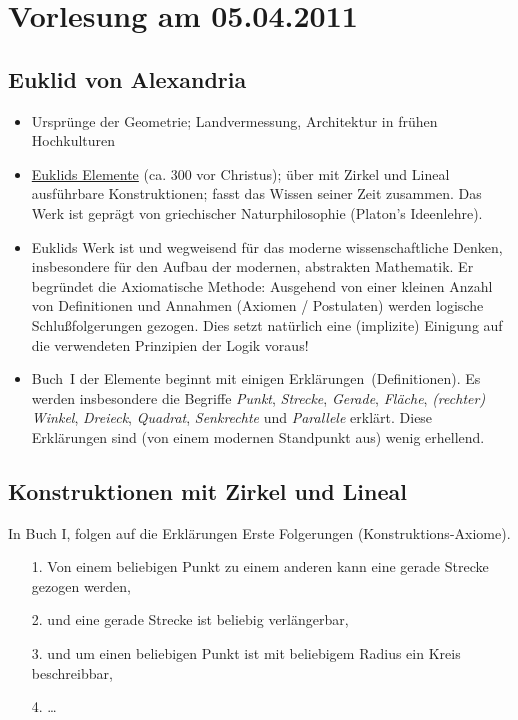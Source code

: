 
\section*{Vorlesung am 05.04.2011}

\subsection*{Euklid von Alexandria}

\begin{itemize}
\item Ursprünge der Geometrie; Landvermessung, Architektur in frühen Hochkulturen

\item \href{http://www.opera-platonis.de/euklid/}{Euklids Elemente}
  (ca. 300 vor Christus); 
über mit Zirkel und Lineal ausführbare Konstruktionen; fasst das
Wissen seiner Zeit zusammen. Das Werk ist geprägt von griechischer Naturphilosophie
(Platon's Ideenlehre).


\item Euklids Werk ist und wegweisend für das moderne
wissenschaftliche Denken, insbesondere für den Aufbau der modernen,
abstrakten Mathematik. Er begründet die \glqq Axiomatische
Methode\grqq : Ausgehend von einer kleinen Anzahl von
  Definitionen und Annahmen (Axiomen / Postulaten) werden logische
  Schlußfolgerungen gezogen. Dies setzt natürlich eine (implizite) Einigung auf 
  die verwendeten Prinzipien der Logik voraus!

\item Buch~I der Elemente beginnt mit einigen \glqq Erklärungen\grqq\
  (Definitionen). Es werden insbesondere die Begriffe {\em Punkt},
  {\em Strecke}, {\em Gerade}, {\em Fläche}, {\em (rechter) Winkel},
  {\em Dreieck}, {\em Quadrat}, {\em Senkrechte} und {\em Parallele} \glqq erklärt\grqq .
  Diese Erklärungen sind (von einem modernen Standpunkt aus)
  wenig erhellend.

\end{itemize}


\subsection*{Konstruktionen mit Zirkel und Lineal}

In Buch I, folgen auf die Erklärungen \glqq Erste Folgerungen\grqq 
(Konstruktions-Axiome).

\begin{enumerate}
\item[1.]
Von einem beliebigen Punkt zu einem anderen kann eine gerade Strecke
gezogen werden,

\item[2.] und eine gerade Strecke ist beliebig verlängerbar,

\item[3.] und um einen beliebigen Punkt ist mit beliebigem Radius ein
  Kreis beschreibbar,

\item[4.] \ldots

\end{enumerate}

